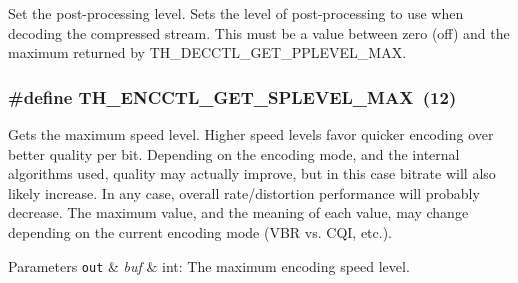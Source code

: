 Set the post-\/processing level. Sets the level of post-\/processing to use when decoding the compressed stream. This must be a value between zero (off) and the maximum returned by T\+H\+\_\+\+D\+E\+C\+C\+T\+L\+\_\+\+G\+E\+T\+\_\+\+P\+P\+L\+E\+V\+E\+L\+\_\+\+M\+A\+X. \hypertarget{group__oldfuncs_ga9baf5bdd206e80c78a8fd44687e89783}{
\subsubsection[{T\+H\+\_\+\+E\+N\+C\+C\+T\+L\+\_\+\+G\+E\+T\+\_\+\+S\+P\+L\+E\+V\+E\+L\+\_\+\+M\+A\+X}]{\setlength{\rightskip}{0pt plus 5cm}\#define T\+H\+\_\+\+E\+N\+C\+C\+T\+L\+\_\+\+G\+E\+T\+\_\+\+S\+P\+L\+E\+V\+E\+L\+\_\+\+M\+A\+X~(12)}}\label{group__oldfuncs_ga9baf5bdd206e80c78a8fd44687e89783}
Gets the maximum speed level. Higher speed levels favor quicker encoding over better quality per bit. Depending on the encoding mode, and the internal algorithms used, quality may actually improve, but in this case bitrate will also likely increase. In any case, overall rate/distortion performance will probably decrease. The maximum value, and the meaning of each value, may change depending on the current encoding mode (V\+B\+R vs. C\+Q\+I, etc.).


\begin{DoxyParams}[1]{Parameters}
\mbox{\tt out}  & {\em buf} & int\+: The maximum encoding speed level. \\
\hline
\end{DoxyParams}

